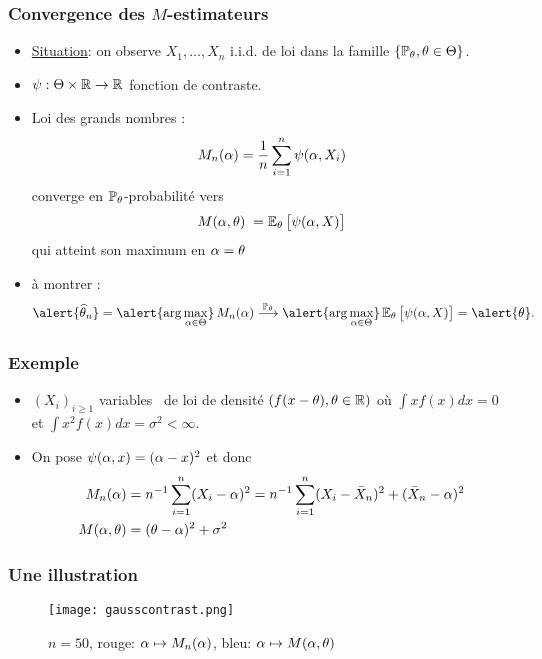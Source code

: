 \begin{frame}
\frametitle{Convergence des $M$-estimateurs}
\begin{itemize}
\item \underline{Situation}: on observe $X_1,\ldots, X_n$ i.i.d. de loi dans la famille $\{\operatorname{{\mathbb P}}_\theta, \theta \in \Theta\}$.
\item $\psi:\Theta \times \operatorname{{\mathbb R}} \rightarrow \operatorname{{\mathbb R}}$ \alert{fonction de contraste}.
\item \alert{Loi des grands nombres :}
$$
M_n(\alpha)=\frac{1}{n}\sum_{i = 1}^n \psi(\alpha,X_i)
$$
converge en $\operatorname{{\mathbb P}}_\theta$-probabilité vers
$$M(\alpha,\theta)\;=\operatorname{{\mathbb E}}_\theta\big[\psi(\alpha,X)\big]$$
\alert{ qui atteint son maximum en $\alpha=\theta$}
\item \og à montrer\fg{} :
$$\alert{\est}= \alert{
\arg \max_{\curtheta \in \Theta}}\, M_n(\curtheta)
\stackrel{\PP_\truetheta}{\longrightarrow} \alert{\arg \max_{\curtheta
\in \Theta}}
\E_\truetheta\big[\psi(\curtheta,X)\big]=\alert{\truetheta}.$$
\end{itemize}
\end{frame}

\begin{frame}
\frametitle{Exemple}
\begin{itemize}
\item $(X_i)_{i \geq 1}$ variables \iid\ de loi de densité $(f(x-\theta), \theta \in \mathbb{R})$ où $\int x f(x) dx=0$ et $\int x^{2} f(x) dx = \sigma^2 < \infty$.
\item On pose $\psi(\alpha,x)= (\alpha-x)^2$ et donc
\begin{align*}
M_n(\alpha)&= n^{-1} \sum_{i=1}^n (X_i - \alpha)^2 = n^{-1} \sum_{i=1}^n (X_i - \bar{X}_n)^2 + (\bar{X}_n - \alpha)^2 \\
M(\alpha,\theta) &= (\theta-\alpha)^2 + \sigma^2
\end{align*}
\end{itemize}
\end{frame}

\begin{frame}
\frametitle{Une illustration}
\begin{figure}
  \centering
  \texttt{[image: gausscontrast.png]}\\
  \caption{$n=50$, rouge: $\alpha \mapsto M_n(\alpha)$, bleu: $\alpha \mapsto M(\alpha,\theta)$}
\end{figure}
\end{frame}

